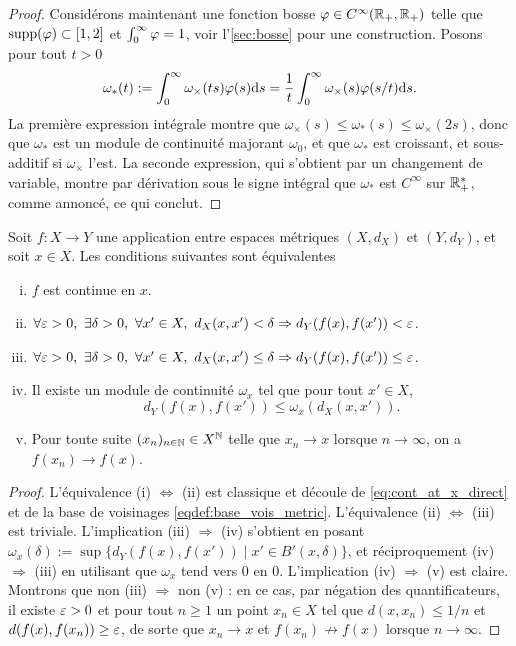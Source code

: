 \begin{proof}
	Considérons maintenant une fonction bosse $\varphi \in C^\infty(\mathbb{R}_+, \mathbb{R}_+)$ telle que $\operatorname{supp}(\varphi) \subset [1,2]$ et $\int_0^\infty \varphi = 1$, voir l'\cref{sec:bosse} pour une construction. 
	Posons pour tout $t>0$
	\begin{equation}
	\label{eq:reg_mod_cont}
		\omega_*(t) := \int_0^\infty \omega_\times(t s) \varphi(s) \mathrm{d} s = \frac 1 t \int_0^\infty \omega_\times(s) \varphi(s/t) \mathrm{d} s.
	\end{equation}
	La première expression intégrale montre que $\omega_\times (s) \leq \omega_*(s) \leq \omega_\times(2s)$, donc que $\omega_*$ est un module de continuité majorant $\omega_0$, et que $\omega_*$ est croissant, et sous-additif si $\omega_\times$ l'est. La seconde expression, qui s'obtient par un changement de variable, montre  par dérivation sous le signe intégral que $\omega_*$ est $C^\infty$ sur $\mathbb{R}_+^*$, comme annoncé, ce qui conclut. 
\end{proof}

\begin{lemma}
\label{lem:contDistance}
%
Soit $f:X \to Y$ une application entre espaces métriques $(X,d_X)$ et $(Y,d_Y)$, et soit $x \in X$. 
Les conditions suivantes sont équivalentes
\begin{enumerate}[(i)]
	\item $f$ est continue en $x$.
	\item $\forall \varepsilon>0,\ \exists \delta>0,\ \forall x' \in X,\ d_X(x,x') < \delta \Rightarrow d_Y(f(x),f(x')) < \varepsilon$.
	\item $\forall \varepsilon>0,\ \exists \delta>0,\ \forall x' \in X,\ d_X(x,x') \leq \delta \Rightarrow d_Y(f(x),f(x')) \leq \varepsilon$.
	\item Il existe un module de continuité $\omega_x$ tel que pour tout $x'\in X$,
\begin{equation}
\label{eq:mod_cont_x}
	d_Y(f(x),f(x')) \leq \omega_x(d_X(x,x')).
\end{equation}
	\item Pour toute suite $(x_n)_{n \in \mathbb{N}} \in X^{\mathbb{N}}$ telle que $x_n \to x$ lorsque $n \to \infty$, on a $f(x_n) \to f(x)$.
\end{enumerate}
\end{lemma}

\begin{proof}
	L'équivalence (i) $\Leftrightarrow$ (ii) est classique et découle de \eqref{eq:cont_at_x_direct} et de la base de voisinages \eqref{eqdef:base_vois_metric}.
	L'équivalence (ii) $\Leftrightarrow$ (iii) est triviale. 
	L'implication (iii) $\Rightarrow$ (iv) s'obtient en posant $\omega_x(\delta) := \sup \{d_Y(f(x),f(x')) \mid x' \in B'(x,\delta)\}$, et réciproquement (iv) $\Rightarrow$ (iii) en utilisant que $\omega_x$ tend vers $0$ en $0$. 
	L'implication (iv) $\Rightarrow$ (v) est claire. Montrons que non (iii) $\Rightarrow$ non (v) : en ce cas, par négation des quantificateurs, il existe $\varepsilon>0$ et pour tout $n\geq 1$ un point $x_n \in X$ tel que $d(x,x_n)\leq 1/n$ et $d(f(x),f(x_n)) \geq \varepsilon$, de sorte que $x_n \to x$ et $f(x_n) \not \to f(x)$ lorsque $n\to \infty$.
\end{proof}

